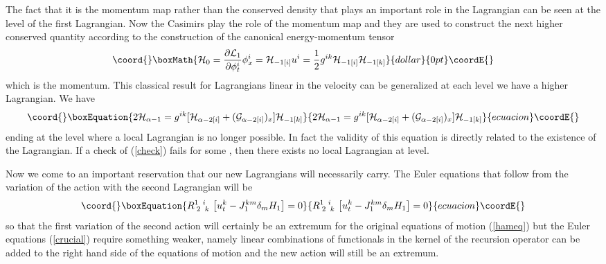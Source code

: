 \documentclass[a4paper,12pt]{article}
\begin{document}
The fact that it is the momentum map rather than the conserved
density that plays an important role in the Lagrangian can be seen
at the level of the first Lagrangian. Now the Casimirs play the
role of the momentum map and they are used to construct the next
higher conserved quantity according to the construction of the
canonical energy-momentum tensor
$$\coord{}\boxMath{ {\cal H}_0 = \frac{\partial {\cal L}_1}{\partial \phi^i_t}
\phi^i_x = {\cal H}_{-1 [i]} u^i = \frac{1}{2} g^{ik} {\cal H}_{-1
[i]}{\cal H}_{-1 [k]} }{dollar}{0pt}\coordE{}$$ which is the momentum. This classical
result for Lagrangians linear in the velocity can be generalized
at each level we have a higher Lagrangian. We have
\begin{equation}\coord{}\boxEquation{
2 {\cal H}_{\alpha-1} = g^{ik} [  {\cal H}_{\alpha-2 [i]} + ({\cal
G}_{\alpha-2 [i] } )_x  ]  {\cal H}_{-1 [k]} \label{check}
}{
2 {\cal H}_{\alpha-1} = g^{ik} [  {\cal H}_{\alpha-2 [i]} + ({\cal
G}_{\alpha-2 [i] } )_x  ]  {\cal H}_{-1 [k]} }{ecuacion}\coordE{}\end{equation}
ending at the level where a local Lagrangian is no longer
possible. In fact the validity of this equation is directly
related to the existence of the Lagrangian. If a check of
(\ref{check}) fails for some \myHighlight{$\alpha$}\coordHE{}, then there exists no local
Lagrangian at \coordHE{} level.

Now we come to an important reservation that our new Lagrangians
will necessarily carry. The Euler equations that follow from the
variation of the action with the second Lagrangian will be
\begin{equation}\coord{}\boxEquation{
 R_{\;2 \; \;k}^{1 \;\; i} \,
  \left[ u^k_{t} - J^{km}_{1}  \delta_m H_1 \right]=0
 \label{crucial}
}{
 R_{\;2 \; \;k}^{1 \;\; i} \,
  \left[ u^k_{t} - J^{km}_{1}  \delta_m H_1 \right]=0
 }{ecuacion}\coordE{}\end{equation}
so that the first variation of the second action will certainly be
an extremum for the original equations of motion (\ref{hameq}) but
the Euler equations (\ref{crucial}) require something weaker,
namely linear combinations of functionals in the kernel of the
recursion operator can be added to the right hand side of the
equations of motion and the new action will still be an extremum.
\end{document}
